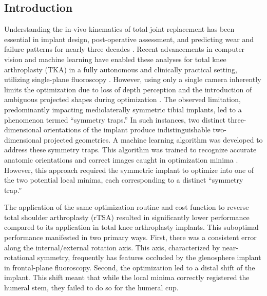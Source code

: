 \subsection{Introduction}
Understanding the in-vivo kinematics of total joint replacement has been essential in implant design, post-operative assessment, and predicting wear and failure patterns for nearly three decades \cite{freglyComputationalWearPrediction2005,banks2003HapPaul2004,banksRationaleResultsFixedBearing2019}.
Recent advancements in computer vision and machine learning have enabled these analyses for total knee arthroplasty (TKA) in a fully autonomous and clinically practical setting, utilizing single-plane fluoroscopy \cite{brobergValidationMachineLearning2023,jensenJointTrackMachine2023}.
However, using only a single camera inherently limits the optimization due to loss of depth perception and the introduction of ambiguous projected shapes during optimization \cite{floodAutomatedRegistration3D2018,mahfouzRobustMethodRegistration2003,zuffiModelbasedMethodReconstruction1999,banksAccurateMeasurementThreedimensional1996}.
The observed limitation, predominantly impacting mediolaterally symmetric tibial implants, led to a phenomenon termed “symmetry traps.”
In such instances, two distinct three-dimensional orientations of the implant produce indistinguishable two-dimensional projected geometries.
A machine learning algorithm was developed to address these symmetry traps. This algorithm was trained to recognize accurate anatomic orientations and correct images caught in optimization minima \cite{jensenCorrectingSymmetricImplantInReview}.
However, this approach required the symmetric implant to optimize into one of the two potential local minima, each corresponding to a distinct “symmetry trap.”

The application of the same optimization routine and cost function \cite{floodAutomatedRegistration3D2018,jensenJointTrackMachine2023} to reverse total shoulder arthroplasty (rTSA) resulted in significantly lower performance compared to its application in total knee arthroplasty implants.
This suboptimal performance manifested in two primary ways.
First, there was a consistent error along the internal/external rotation axis.
This axis, characterized by near-rotational symmetry, frequently has features occluded by the glenosphere implant in frontal-plane fluoroscopy.
Second, the optimization led to a distal shift of the implant.
This shift meant that while the local minima correctly registered the humeral stem, they failed to do so for the humeral cup.

